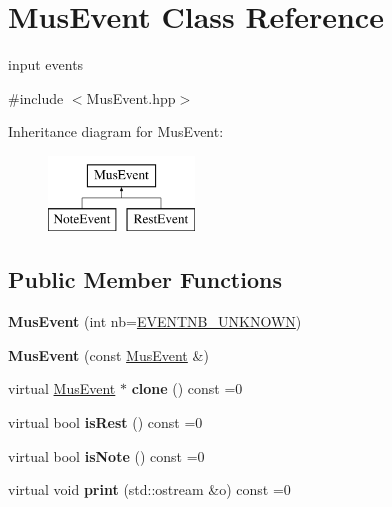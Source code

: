 \hypertarget{classMusEvent}{}\section{Mus\+Event Class Reference}
\label{classMusEvent}


input events  




{\ttfamily \#include $<$Mus\+Event.\+hpp$>$}

Inheritance diagram for Mus\+Event\+:\begin{figure}[H]
\begin{center}
\leavevmode
\includegraphics[height=2.000000cm]{classMusEvent}
\end{center}
\end{figure}
\subsection*{Public Member Functions}
\begin{DoxyCompactItemize}
\item 
{\bfseries Mus\+Event} (int nb=\mbox{\hyperlink{group__general_gac3b19762b16f33de03662fd4289fe5a9}{E\+V\+E\+N\+T\+N\+B\+\_\+\+U\+N\+K\+N\+O\+WN}})
\item 
{\bfseries Mus\+Event} (const \mbox{\hyperlink{classMusEvent}{Mus\+Event}} \&)
\item 
\mbox{\label{classMusEvent_a013a5d979aeac811d74929b41b188762}} 
virtual \mbox{\hyperlink{classMusEvent}{Mus\+Event}} $\ast$ {\bfseries clone} () const =0
\item 
\mbox{\label{classMusEvent_aa2d6c7ee99cdd95839aee1e5b5df2d92}} 
virtual bool {\bfseries is\+Rest} () const =0
\item 
\mbox{\label{classMusEvent_abf3d0067b2b28275a26223083b745c7c}} 
virtual bool {\bfseries is\+Note} () const =0
\item 
\mbox{\label{classMusEvent_a1a53c7e09246ad1441d26069ff4a9387}} 
virtual void {\bfseries print} (std\+::ostream \&o) const =0
\end{DoxyCompactItemize}

